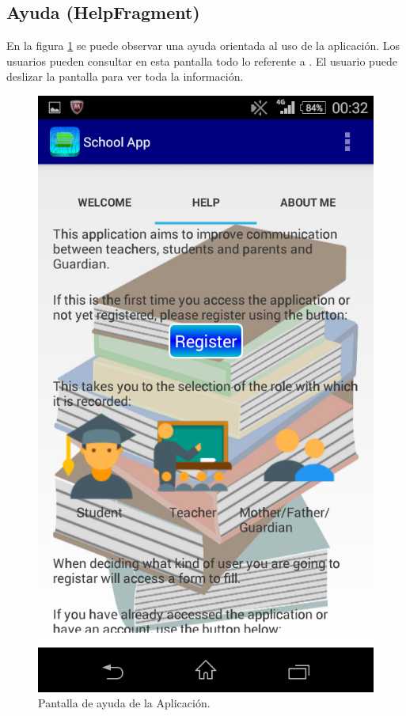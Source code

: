 		\subsection{Ayuda (HelpFragment)}
			
			En la figura \ref{fig:help} se puede observar una ayuda orientada al uso de la aplicación. Los usuarios pueden consultar en esta pantalla todo lo referente a \CollegeApp. El usuario puede deslizar la pantalla para ver toda la información.
			
			\begin{figure}[h !]
				\centering
				\includegraphics[scale=0.2]{Imagenes/App/help}
				\caption{Pantalla de ayuda de la Aplicación.}
				\label{fig:help}
			\end{figure}
		
